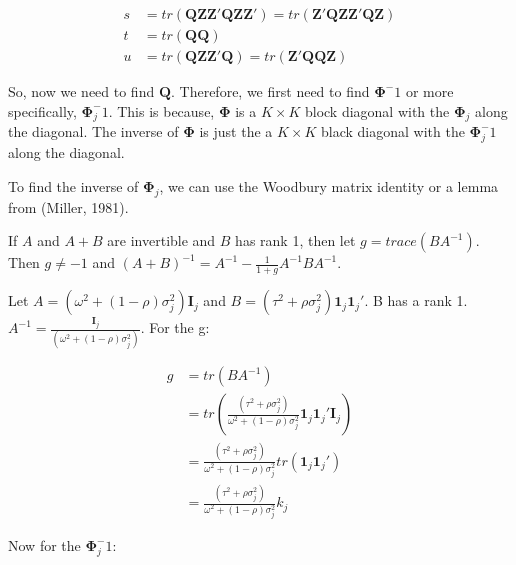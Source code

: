 \begin{equation}
    \begin{split}
        s & = tr(\mathbf{Q}\mathbf{Z}\mathbf{Z}'\mathbf{Q}\mathbf{Z}\mathbf{Z}') = tr(\mathbf{Z}'\mathbf{Q}\mathbf{Z}\mathbf{Z}'\mathbf{Q}\mathbf{Z}) \\
        t & = tr(\mathbf{Q} \mathbf{Q}) \\
        u & = tr(\mathbf{Q} \mathbf{Z}\mathbf{Z}'\mathbf{Q}) = tr(\mathbf{Z}'\mathbf{Q}\mathbf{Q}\mathbf{Z})
    \end{split}
\end{equation}



So, now we need to find $\mathbf{Q}$. Therefore, we first need to find $\mathbf{\Phi}^-1$ or more specifically, $\mathbf{\Phi}_j^-1$. This is because,  $\mathbf{\Phi}$ is a $K \times K$ block diagonal with the $\mathbf{\Phi}_j$ along the diagonal. The inverse of $\mathbf{\Phi}$ is just the a $K \times K$ black diagonal with the $\mathbf{\Phi}_j^-1$ along the diagonal. 

To find the inverse of $\mathbf{\Phi}_j$, we can use the Woodbury matrix identity or a lemma from (Miller, 1981). 

If $A$ and $A+B$ are invertible and $B$ has rank 1, then let $g = trace(BA^{-1})$. Then $g\neq -1$ and $(A +B)^{-1} = A^{-1} - \frac{1}{1+g}A^{-1}BA^{-1}$.

Let $A = (\omega^2 + (1- \rho)\sigma^2_j)\mathbf{I}_j$ and $B=(\tau^2 + \rho\sigma_j^2)\mathbf{1}_j\mathbf{1}_j'$. B has a rank 1. $A^{-1} = \frac{\mathbf{I}_j}{(\omega^2 +(1- \rho)\sigma_j^2)}$. For the g: 

\begin{equation}
    \begin{split}
        g &= tr(BA^{-1}) \\
        & = tr\left(\frac{(\tau^2 + \rho\sigma_j^2)}{\omega^2 +(1-\rho)\sigma_j^2} \mathbf{1}_j\mathbf{1}_j' \mathbf{I}_j    \right) \\
        & = \frac{(\tau^2 + \rho\sigma_j^2)}{\omega^2 +(1-\rho)\sigma_j^2} tr( \mathbf{1}_j\mathbf{1}_j') \\
        & = \frac{(\tau^2 + \rho\sigma_j^2)}{\omega^2 +(1-\rho)\sigma_j^2} k_j
    \end{split}
    \nonumber
\end{equation}

Now for the $\mathbf{\Phi}_j^-1$:


